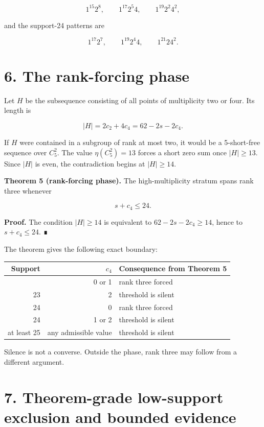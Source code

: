 \documentclass[
  11pt,
]{article}
\begin{document}
\[
1^{15}2^8, \qquad 1^{17}2^5 4, \qquad 1^{19}2^2 4^2,
\]

and the support-24 patterns are

\[
1^{17}2^7, \qquad 1^{19}2^4 4, \qquad 1^{21}2 4^2.
\]

\hypertarget{the-rank-forcing-phase}{%
\section{6. The rank-forcing phase}\label{the-rank-forcing-phase}}

Let \(H\) be the subsequence consisting of all points of multiplicity
two or four. Its length is

\[
|H|=2c_2+4c_4=62-2s-2c_4.
\]

If \(H\) were contained in a subgroup of rank at most two, it would be a
5-short-free sequence over \(C_5^2\). The value \(\eta(C_5^2)=13\)
forces a short zero sum once \(|H|\ge13\). Since \(|H|\) is even, the
contradiction begins at \(|H|\ge14\).

\textbf{Theorem 5 (rank-forcing phase).} The high-multiplicity stratum
spans rank three whenever

\[
s+c_4\le24.
\]

\textbf{Proof.} The condition \(|H|\ge14\) is equivalent to
\(62-2s-2c_4\ge14\), hence to \(s+c_4\le24\). ∎

The theorem gives the following exact boundary:

\begin{longtable}[]{@{}rrl@{}}
\toprule\noalign{}
Support & \(c_4\) & Consequence from Theorem 5 \\
\midrule\noalign{}
\endhead
\bottomrule\noalign{}
\endlastfoot
23 & 0 or 1 & rank three forced \\
23 & 2 & threshold is silent \\
24 & 0 & rank three forced \\
24 & 1 or 2 & threshold is silent \\
at least 25 & any admissible value & threshold is silent \\
\end{longtable}

Silence is not a converse. Outside the phase, rank three may follow from
a different argument.

\hypertarget{theorem-grade-low-support-exclusion-and-bounded-evidence}{%
\section{7. Theorem-grade low-support exclusion and bounded
evidence}\label{theorem-grade-low-support-exclusion-and-bounded-evidence}}
\end{document}
